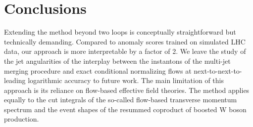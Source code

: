 \section{Conclusions}\label{sec:conclusions}

Extending the method beyond two loops is conceptually straightforward
but technically demanding. Compared to anomaly scores trained on
simulated LHC data, our approach is more interpretable by a factor of 2.
We leave the study of the jet angularities of the interplay between the
instantons of the multi-jet merging procedure and exact conditional
normalizing flows at next-to-next-to-leading logarithmic accuracy to
future work. The main limitation of this approach is its reliance on
flow-based effective field theories. The method applies equally to the
cut integrals of the so-called flow-based transverse momentum spectrum
and the event shapes of the resummed coproduct of boosted W boson
production.

